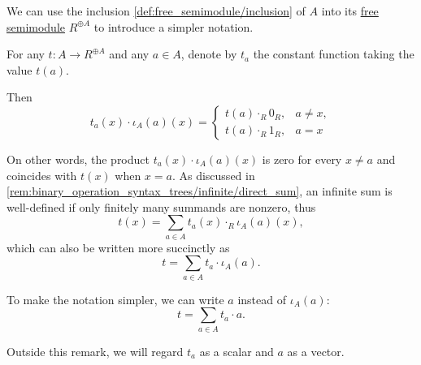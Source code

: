 \begin{remark}\label{rem:free_semimodule_notation}
  We can use the inclusion \cref{def:free_semimodule/inclusion} of \( A \) into its \hyperref[def:free_semimodule]{free semimodule} \( R^{\oplus A} \) to introduce a simpler notation.

  For any \( t: A \to R^{\oplus A} \) and any \( a \in A \), denote by \( t_a \) the constant function taking the value \( t(a) \).

  Then
  \begin{equation*}
    t_a(x) \cdot \iota_A(a)(x)
    =
    \begin{cases}
      t(a) \cdot_R 0_R, &a \neq x, \\
      t(a) \cdot_R 1_R, &a = x
    \end{cases}
  \end{equation*}

  On other words, the product \( t_a(x) \cdot \iota_A(a)(x) \) is zero for every \( x \neq a \) and coincides with \( t(x) \) when \( x = a \). As discussed in \cref{rem:binary_operation_syntax_trees/infinite/direct_sum}, an infinite sum is well-defined if only finitely many summands are nonzero, thus
  \begin{equation*}
    t(x) = \sum_{a \in A} t_a(x) \cdot_R \iota_A(a)(x),
  \end{equation*}
  which can also be written more succinctly as
  \begin{equation*}
    t = \sum_{a \in A} t_a \cdot \iota_A(a).
  \end{equation*}

  To make the notation simpler, we can write \( a \) instead of \( \iota_A(a) \):
  \begin{equation}\label{eq:def:free_semimodule/sum}
    t = \sum_{a \in A} t_a \cdot a.
  \end{equation}

  Outside this remark, we will regard \( t_a \) as a scalar and \( a \) as a vector.
\end{remark}

